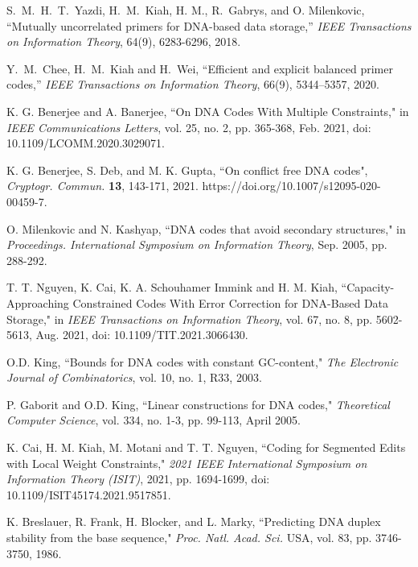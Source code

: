 \documentclass[conference]{IEEEtran}
\theoremstyle{plain}
\theoremstyle{definition}
\begin{document}
\begin{thebibliography}{99}
S.~M.~H.~T.~Yazdi, H.~M.~Kiah, H. M., R.~Gabrys, and O. Milenkovic, 
``Mutually uncorrelated primers for DNA-based data storage,'' 
\emph{IEEE Transactions on Information Theory}, 64(9), 6283-6296, 2018.



Y.~M.~Chee, H.~M.~Kiah and H.~Wei,
``Efficient and explicit balanced primer codes,'' 
\emph{IEEE Transactions on Information Theory}, 66(9), 5344--5357, 2020.


 K. G. Benerjee and A. Banerjee, ``On DNA Codes With Multiple Constraints," in {\em IEEE Communications Letters}, vol. 25, no. 2, pp. 365-368, Feb. 2021, doi: 10.1109/LCOMM.2020.3029071.

 K. G. Benerjee, S. Deb, and M. K. Gupta, ``On conflict free DNA codes", {\em Cryptogr. Commun.} {\bf 13}, 143-171, 2021. https://doi.org/10.1007/s12095-020-00459-7.

 O. Milenkovic and N. Kashyap, ``DNA codes that avoid secondary structures," in {\em Proceedings. International Symposium on Information Theory}, Sep. 2005, pp. 288-292.

 T. T. Nguyen, K. Cai, K. A. Schouhamer Immink and H. M. Kiah, ``Capacity-Approaching Constrained Codes With Error Correction for DNA-Based Data Storage," in {\em IEEE Transactions on Information Theory}, vol. 67, no. 8, pp. 5602-5613, Aug. 2021, doi: 10.1109/TIT.2021.3066430.

 O.D. King, ``Bounds for DNA codes with constant GC-content," {\em The Electronic Journal of Combinatorics}, vol. 10, no. 1, R33, 2003.

 P. Gaborit and O.D. King, ``Linear constructions for DNA codes," {\em Theoretical Computer Science}, vol. 334, no. 1-3, pp. 99-113, April 2005.

 K. Cai, H. M. Kiah, M. Motani and T. T. Nguyen, ``Coding for Segmented Edits with Local Weight Constraints," {\em 2021 IEEE International Symposium on Information Theory (ISIT)}, 2021, pp. 1694-1699, doi: 10.1109/ISIT45174.2021.9517851.


 K. Breslauer, R. Frank, H. Blocker, and L. Marky, ``Predicting DNA duplex stability from the base sequence," {\em Proc. Natl. Acad. Sci.} USA, vol. 83, pp. 3746-3750, 1986.


\end{thebibliography}
\end{document}
